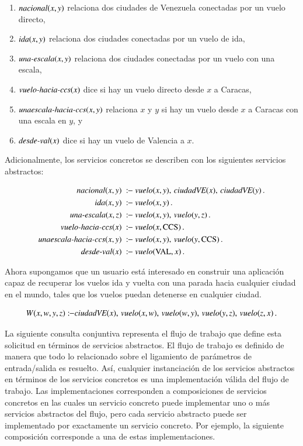 \begin{enumerate}[--]
\item $\text{\it nacional}(x,y)$ relaciona dos ciudades de Venezuela conectadas por un vuelo directo,
\item $\text{\it ida}(x,y)$ relaciona dos ciudades conectadas por un vuelo de ida,
\item $\text{\it una-escala}(x,y)$ relaciona dos ciudades conectadas por un vuelo con una escala,
\item $\text{\it vuelo-hacia-ccs}(x)$ dice si hay un vuelo directo desde $x$ a Caracas,
\item $\text{\it unaescala-hacia-ccs}(x,y)$ relaciona $x$ y $y$ si hay un vuelo desde $x$ a Caracas con una escala en $y$, y
\item $\text{\it desde-val}(x)$ dice si hay un vuelo de Valencia a $x$.
\end{enumerate}

Adicionalmente, los servicios concretos se describen con los siguientes
servicios abstractos:

\begin{alignat*}{1}
\nacional(x,y)\   &\qrule\ \vuelo(x,y),\,\ciudadVE(x),\,\ciudadVE(y)\,. \\
\ida(x,y)\     &\qrule\ \vuelo(x,y)\,. \\
\unaescala(x,z)\    &\qrule\ \vuelo(x,y),\,\vuelo(y,z)\,. \\
\vueloCCS(x)\     &\qrule\ \vuelo(x,\PA)\,. \\
\unaparadaCCS(x,y)\  &\qrule\ \vuelo(x,y),\,\vuelo(y,\PA)\,. \\
\desdeVAL(x)\       &\qrule\ \vuelo(\NY,x)\,.
\end{alignat*}

Ahora supongamos que un usuario está interesado en construir una aplicación
capaz de recuperar los vuelos ida y vuelta con una parada hacia cualquier ciudad
en el mundo, tales que los vuelos puedan detenerse en cualquier ciudad.

\[ W(x,w,y,z) :\!\!- \text{\it ciudadVE}(x),\,\text{\it vuelo}(x,w),\,\text{\it vuelo}(w,y),\,\text{\it vuelo}(y,z),\,\text{\it vuelo}(z,x)\,. \]

La siguiente consulta conjuntiva representa el flujo de trabajo que define esta
solicitud en términos de servicios abstractos. El flujo de trabajo es definido
de manera que todo lo relacionado sobre el ligamiento de parámetros de
entrada/salida es resuelto. Así, cualquier instanciación de los servicios
abstractos en términos de los servicios concretos es una implementación válida
del flujo de trabajo. Las implementaciones corresponden a composiciones de
servicios concretos en las cuales un servicio concreto puede implementar uno o
más servicios abstractos del flujo, pero cada servicio abstracto puede ser
implementado por exactamente un servicio concreto. Por ejemplo, la siguiente
composición corresponde a una de estas implementaciones.

